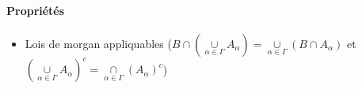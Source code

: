 \documentclass{article}
\begin{document}
\paragraph{Propriétés}
\begin{itemize}
  \item Lois de morgan appliquables ($B \cap (\underset{\alpha \in \Gamma}{\overset{}{\cup }} A_\alpha) = \underset{\alpha \in \Gamma}{\overset{}{\cup}} (B \cap  A_\alpha)$ et $(\underset{\alpha \in \Gamma}{\overset{}{\cup }} A_\alpha)^{c} = \underset{\alpha \in \Gamma}{\overset{}{\cap }} (A_\alpha)^{c}$)
\end{itemize}


  
  
  
  
  
  
  
\end{document}
